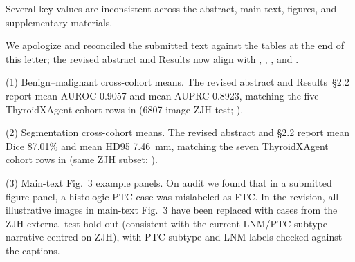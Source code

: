 \label{rev:R2.1}
\begin{reviewercomment}
Several key values are inconsistent across the abstract, main text, figures, and supplementary materials.
\end{reviewercomment}
\begin{authorresponse}
We apologize and reconciled the submitted text against the tables at the end of this letter; the revised abstract and Results now align with , , , and .\par
(1) Benign--malignant cross-cohort means. The revised abstract and Results~§2.2 report mean AUROC 0.9057 and mean AUPRC 0.8923, matching the five ThyroidXAgent cohort rows in  (6807-image ZJH test; ).\par
(2) Segmentation cross-cohort means. The revised abstract and §2.2 report mean Dice 87.01\% and mean HD95 7.46~mm, matching the seven ThyroidXAgent cohort rows in  (same ZJH subset; ).\par
(3) Main-text Fig.~3 example panels. On audit we found that in a submitted figure panel, a histologic PTC case was mislabeled as FTC. In the revision, all illustrative images in main-text Fig.~3 have been replaced with cases from the ZJH external-test hold-out (consistent with the current LNM/PTC-subtype narrative centred on ZJH), with PTC-subtype and LNM labels checked against the captions.\par
\par

\end{authorresponse}




